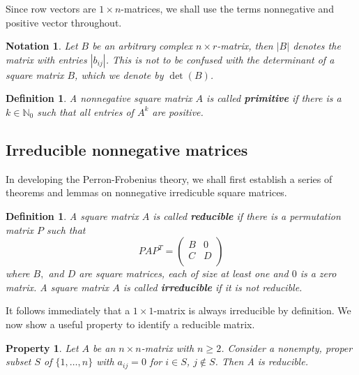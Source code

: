 \documentclass[a4paper,11pt]{report}
\newtheorem{property}[theorem]{Property}
\newtheorem{definition}[theorem]{Definition}
\newtheorem{notation}[theorem]{Notation}
\newcommand{\N}{{\mathbb N}}
\begin{document}
Since row vectors are $1 \times n$-matrices, we shall use the terms 
nonnegative and positive vector throughout. 

\begin{notation}\label{modulusmatrix}
  Let $B$ be an arbitrary complex $n\times r$-matrix, then $|B|$ denotes the 
  matrix with entries $|b_{ij}|$. This is not to be confused with the 
  determinant of a square matrix $B$, which we denote by $\det(B)$.
\end{notation}

\begin{definition}  A nonnegative square matrix $A$ is called \textbf{primitive} if there is a $k \in \N_0$ such that all entries of $A^k$ are positive.
 \end{definition}

\subsection{Irreducible nonnegative matrices}
In developing the Perron-Frobenius theory, we shall first establish a series of 
theorems and lemmas on nonnegative irredicuble square matrices. 
\begin{definition}\label{defreduciebel} A square matrix $A$ is called \textbf{reducible} if there is a permutation matrix $P$ such that 
 $$PAP^T = \begin{pmatrix}  B  & 0\\
 C  & D\\
\end{pmatrix} $$
where $B,$ and $D$ are square matrices, each of size at least one and $0$ is a zero matrix.
A square matrix $A$ is called \textbf{irreducible} if it is not reducible.
 \end{definition}
It follows immediately that a $1\times1$-matrix is always irreducible by 
definition. We now show a useful property to identify a reducible matrix.
\begin{property}\label{propertyreducible}
  Let $A$ be an $n\times n$-matrix with $n\geq 2$. Consider a nonempty, proper subset $S$ of $\{1,\ldots,n\}$ with 
  $a_{ij}=0$ for $i \in S$, 
  $j \not\in S$. Then A is  reducible.
\end{property}
\end{document}
